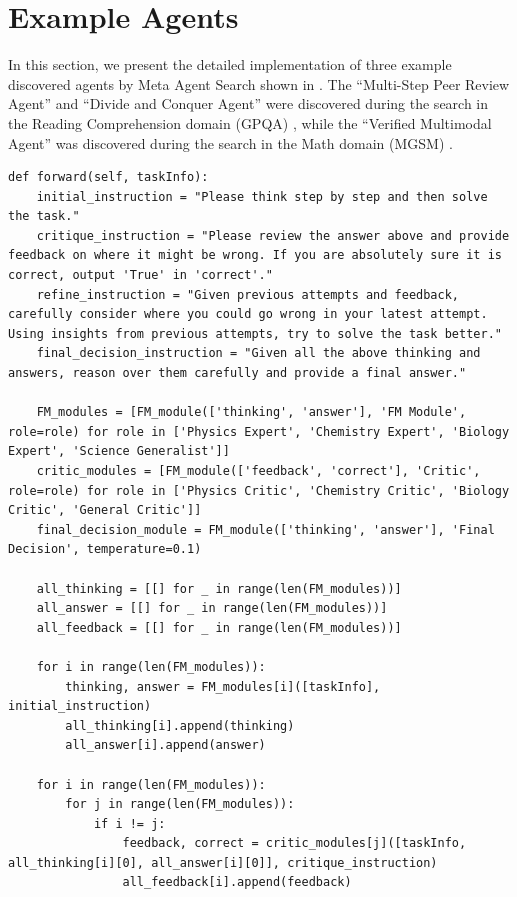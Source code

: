 \documentclass{article} %
\newcommand{\ouralgo}{Meta Agent Search\xspace}
\begin{document}
\section{Example Agents}
\label{append_section:example_agents}

In this section, we present the detailed implementation of three example discovered agents by \ouralgo shown in . The ``Multi-Step Peer Review Agent'' and ``Divide and Conquer Agent'' were discovered during the search in the Reading Comprehension domain (GPQA) \citep{rein2023gpqa}, while the ``Verified Multimodal Agent'' was discovered during the search in the Math domain (MGSM) \citep{shi2023language}.

\begin{lstlisting}[style=pythonstyle, caption={Example discovered agent: Multi-Step Peer Review Agent}]
def forward(self, taskInfo):
    initial_instruction = "Please think step by step and then solve the task."
    critique_instruction = "Please review the answer above and provide feedback on where it might be wrong. If you are absolutely sure it is correct, output 'True' in 'correct'."
    refine_instruction = "Given previous attempts and feedback, carefully consider where you could go wrong in your latest attempt. Using insights from previous attempts, try to solve the task better."
    final_decision_instruction = "Given all the above thinking and answers, reason over them carefully and provide a final answer."

    FM_modules = [FM_module(['thinking', 'answer'], 'FM Module', role=role) for role in ['Physics Expert', 'Chemistry Expert', 'Biology Expert', 'Science Generalist']]
    critic_modules = [FM_module(['feedback', 'correct'], 'Critic', role=role) for role in ['Physics Critic', 'Chemistry Critic', 'Biology Critic', 'General Critic']]
    final_decision_module = FM_module(['thinking', 'answer'], 'Final Decision', temperature=0.1)

    all_thinking = [[] for _ in range(len(FM_modules))]
    all_answer = [[] for _ in range(len(FM_modules))]
    all_feedback = [[] for _ in range(len(FM_modules))]

    for i in range(len(FM_modules)):
        thinking, answer = FM_modules[i]([taskInfo], initial_instruction)
        all_thinking[i].append(thinking)
        all_answer[i].append(answer)

    for i in range(len(FM_modules)):
        for j in range(len(FM_modules)):
            if i != j:
                feedback, correct = critic_modules[j]([taskInfo, all_thinking[i][0], all_answer[i][0]], critique_instruction)
                all_feedback[i].append(feedback)


\end{lstlisting}
\end{document}
